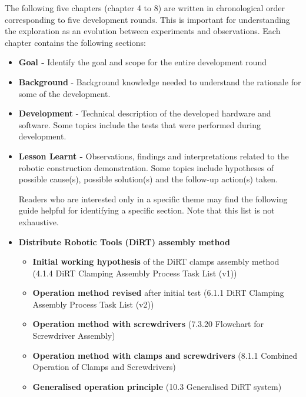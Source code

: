\documentclass[11pt]{book}
\begin{document}
The following five chapters (chapter 4 to 8) are written in chronological order corresponding to five development rounds. This is important for understanding the exploration as an evolution between experiments and observations.  Each chapter contains the following sections:

\vspace{1\baselineskip}
\begin{itemize}
	\item \textbf{Goal - }Identify the goal and scope for the entire development round

	\item \textbf{Background }- Background knowledge needed to understand the rationale for some of the development.

	\item \textbf{Development }- Technical description of the developed hardware and software. Some topics include the tests that were performed during development.

	\item \textbf{Lesson Learnt - }Observations, findings and interpretations related to the robotic construction demonstration. Some topics include hypotheses of possible cause(s), possible solution(s) and the follow-up action(s) taken. 

Readers who are interested only in a specific theme may find the following guide helpful for identifying a specific section. Note that this list is not exhaustive. 

	\item \textbf{Distribute Robotic Tools (DiRT) assembly method}

\begin{itemize}
	\item \textbf{Initial working hypothesis} of the DiRT clamps assembly method (4.1.4 DiRT Clamping Assembly Process Task List (v1))

	\item \textbf{Operation method revised} after initial test (6.1.1 DiRT Clamping Assembly Process Task List (v2))

	\item \textbf{Operation method with screwdrivers} (7.3.20 Flowchart for Screwdriver Assembly)

	\item \textbf{Operation method with clamps and screwdrivers }(8.1.1 Combined Operation of Clamps and Screwdrivers)

	\item \textbf{Generalised operation principle} (10.3 Generalised DiRT system)


\end{itemize}
\end{itemize}
\end{document}
